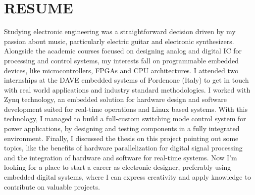 \section{RESUME}
Studying electronic engineering was a straightforward decision driven by my passion about music, particularly electric guitar and electronic synthesizers.
Alongside the academic courses focused on designing analog and digital IC for processing and control systems, my interests fall on programmable embedded devices, like microcontrollers, FPGAs and CPU architectures.
I attended two internships at the DAVE embedded systems of Pordenone (Italy) to get in touch with real world applications and industry standard methodologies.
I worked with Zynq technology, an embedded solution for hardware design and software development suited for real-time operations and Linux based systems. 
With this technology, I managed to build a full-custom switching mode control system for power applications, by designing and testing components in a fully integrated environment.
Finally, I discussed the thesis on this project pointing out some topics, like the benefits of hardware parallelization for digital signal processing and the integration of hardware and software for real-time systems.
Now I'm looking for a place to start a career as electronic designer, preferably using embedded digital systems, where I can express creativity and apply knowledge to contribute on valuable projects.

